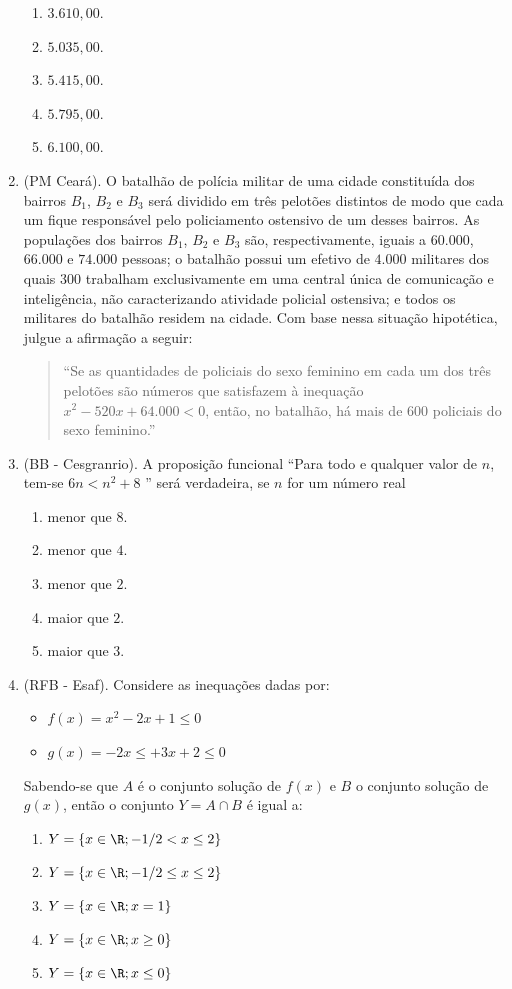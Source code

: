 \begin{enumerate}
\begin{enumerate}
\item $3.610{,}00$.
\item $5.035{,}00$.
\item $5.415{,}00$.
\item $5.795{,}00$.
\item $6.100{,}00$.
\end{enumerate}


\item (PM Ceará). O batalhão de polícia militar de uma cidade constituída dos bairros $B_1$, $B_2$ e $B_3$ será dividido em três pelotões distintos de modo que cada um fique responsável pelo policiamento ostensivo de um desses bairros. As populações dos bairros $B_1$, $B_2$ e $B_3$ são, respectivamente, iguais a $60.000$, $66.000$ e $74.000$ pessoas; o batalhão possui um efetivo de $4.000$ militares dos quais $300$ trabalham exclusivamente em uma central única de comunicação e inteligência, não caracterizando atividade policial ostensiva; e todos os militares do batalhão residem na cidade. Com base nessa situação hipotética, julgue a afirmação a seguir:
\begin{quote}
“Se as quantidades de policiais do sexo feminino em cada um dos três pelotões são números que satisfazem à inequação $x^2 - 520x + 64.000 < 0$, então, no batalhão, há mais de $600$ policiais do sexo feminino.”
\end{quote}

\item (BB - Cesgranrio). A proposição funcional “Para todo e qualquer valor de $n$, tem-se $6n < n^2 + 8$  ” será verdadeira, se $n$ for um número real
\begin{enumerate}
\item menor que $8$.
\item menor que $4$.
\item menor que $2$.
\item maior que $2$.
\item maior que $3$.
\end{enumerate}

\item (RFB - Esaf). Considere as inequações dadas por:
\begin{itemize}
\item $f(x) = x^2 - 2x + 1 \leq 0$
\item $g(x) = -2x\leq + 3x + 2 \leq 0$
\end{itemize}
Sabendo-se que $A$ é o conjunto solução de $f(x)$ e $B$ o conjunto solução de $g(x)$, então o conjunto $Y = A \cap B$ é igual a:
\begin{enumerate}
\item $Y = \{ x \in \R ; -1/2 < x \leq 2 \}$
\item $Y = \{ x \in \R ; -1/2 \leq x \leq 2 \}$
\item $Y = \{ x \in \R ; x = 1 \}$
\item $Y = \{ x \in \R ; x \geq 0 \}$
\item $Y = \{ x \in \R ; x \leq 0 \}$
\end{enumerate}



\end{enumerate}
